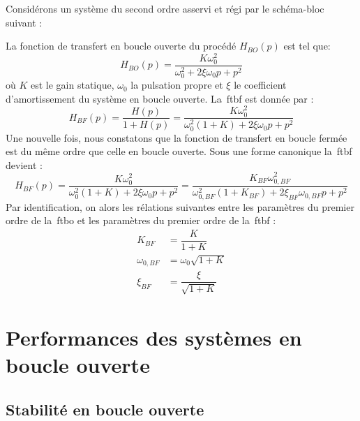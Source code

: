 Considérons un système du second ordre asservi et régi par le schéma-bloc suivant :
\begin{center}
\end{center}
La fonction de transfert en boucle ouverte du procédé $H_{BO}(p)$ est tel que:
$$
H_{BO}(p)=\dfrac{K\omega^2_0}{\omega^2_0+2\xi\omega_0p+p^2}
$$
où $K$ est le gain statique, $\omega_0$ la pulsation propre et $\xi$ 
le coefficient d'amortissement du système en boucle ouverte.
La~\gls{ftbf} est donnée par :
$$
H_{BF}(p)=\dfrac{H(p)}{1+H(p)}=\dfrac{K\omega^2_0}{\omega^2_0(1+K)+2\xi\omega_0p+p^2}
$$
Une nouvelle fois, nous constatons que la fonction de transfert en boucle fermée est du même ordre
que celle en boucle ouverte. Sous une forme canonique la~\gls{ftbf} devient :
$$
H_{BF}(p)=\dfrac{K\omega^2_0}{\omega^2_0(1+K)+2\xi\omega_0p+p^2}=
\dfrac{K_{BF}\omega^2_{0,BF}}{\omega^2_{0,BF}(1+K_{BF})+2\xi_{BF}\omega_{0,BF}p+p^2}
$$
Par identification, on alors les rélations suivantes entre les paramètres du premier ordre 
de la~\gls{ftbo} et les paramètres du premier ordre de la~\gls{ftbf} :
\begin{align*}
       K_{BF}&=\dfrac{K}{1+K}\\
    \omega_{0,BF}&=\omega_0\sqrt{1+K}\\
    \xi_{BF}&=\dfrac{\xi}{\sqrt{1+K}}
\end{align*}

\section{Performances des systèmes en boucle ouverte}

\subsection{Stabilité en boucle ouverte}

